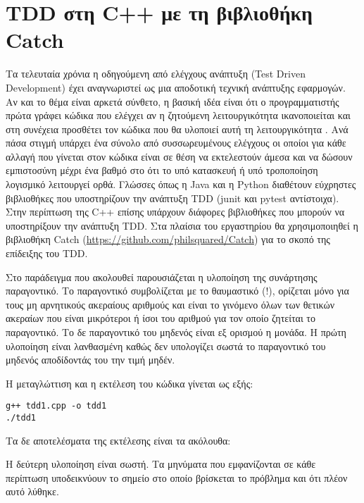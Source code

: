 \section*{TDD στη C++ με τη βιβλιοθήκη Catch}
Τα τελευταία χρόνια η οδηγούμενη από ελέγχους ανάπτυξη (Test Driven Development) έχει αναγνωριστεί ως μια αποδοτική τεχνική ανάπτυξης εφαρμογών. Αν και το θέμα είναι αρκετά σύνθετο, η βασική ιδέα είναι ότι ο προγραμματιστής πρώτα γράφει κώδικα που ελέγχει αν η ζητούμενη λειτουργικότητα ικανοποιείται και στη συνέχεια προσθέτει τον κώδικα που θα υλοποιεί αυτή τη λειτουργικότητα \cite{butunclebob_tdd}. Ανά πάσα στιγμή υπάρχει ένα σύνολο από συσσωρευμένους ελέγχους οι οποίοι για κάθε αλλαγή που γίνεται στον κώδικα είναι σε θέση να εκτελεστούν άμεσα και να δώσουν εμπιστοσύνη μέχρι ένα βαθμό στο ότι το υπό κατασκευή ή υπό τροποποίηση λογισμικό λειτουργεί ορθά. Γλώσσες όπως η Java και η Python διαθέτουν εύχρηστες βιβλιοθήκες που υποστηρίζουν την ανάπτυξη TDD (junit και pytest αντίστοιχα). Στην περίπτωση της C++ επίσης υπάρχουν διάφορες βιβλιοθήκες που μπορούν να υποστηρίξουν την ανάπτυξη TDD. Στα πλαίσια του εργαστηρίου θα χρησιμοποιηθεί η βιβλιοθήκη Catch (\href{https://github.com/philsquared/Catch}{https://github.com/philsquared/Catch}) για το σκοπό της επίδειξης του TDD.

Στο παράδειγμα που ακολουθεί παρουσιάζεται η υλοποίηση της συνάρτησης παραγοντικό. Το παραγοντικό συμβολίζεται με το θαυμαστικό (!), ορίζεται μόνο για τους μη αρνητικούς ακεραίους αριθμούς και είναι το γινόμενο όλων των θετικών ακεραίων που είναι μικρότεροι ή ίσοι του αριθμού για τον οποίο ζητείται το παραγοντικό. Το δε παραγοντικό του μηδενός είναι εξ ορισμού η μονάδα. Η πρώτη υλοποίηση είναι λανθασμένη καθώς δεν υπολογίζει σωστά το παραγοντικό του μηδενός αποδίδοντάς του την τιμή μηδέν. 



Η μεταγλώττιση και η εκτέλεση του κώδικα γίνεται ως εξής:
\begin{lstlisting}[style=DOS]
g++ tdd1.cpp -o tdd1
./tdd1
\end{lstlisting}

Τα δε αποτελέσματα της εκτέλεσης είναι τα ακόλουθα:



Η δεύτερη υλοποίηση είναι σωστή. Τα μηνύματα που εμφανίζονται σε κάθε περίπτωση υποδεικνύουν το σημείο στο οποίο βρίσκεται το πρόβλημα και ότι πλέον αυτό λύθηκε.

